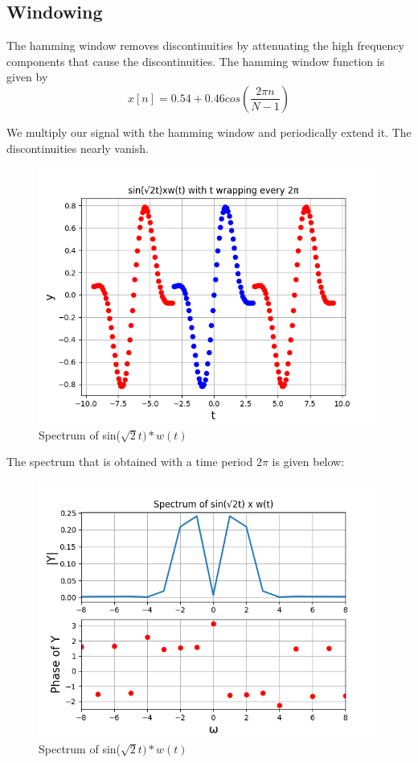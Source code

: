 \documentclass[11pt, a4paper]{article}
\begin{document}
\subsection{Windowing}
The hamming window removes discontinuities by attenuating the high frequency components that cause the discontinuities.
The hamming window function is given by
\begin{equation}
    x[n] = 0.54 + 0.46cos(\frac{2\pi n}{N-1})
\end{equation}

We multiply our signal with the hamming window and periodically extend it. The discontinuities nearly vanish.
\begin{figure}[h!]
\centering
\includegraphics[scale=0.6]{fig10-5.png}
\caption{Spectrum of sin($\sqrt{2}t)*w(t)$}
\label{fig:universe}
\end{figure}
\clearpage
The spectrum that is obtained with a time period $2\pi$ is given below:
\begin{figure}[h!]
\centering
\includegraphics[scale=0.6]{fig10-6.png}
\caption{Spectrum of sin($\sqrt{2}t)*w(t)$}
\label{fig:universe}
\end{figure}
\end{document}
